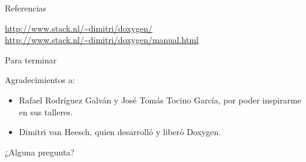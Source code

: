 \documentclass[12pt,xcolor=svgnames]{beamer}
\begin{document}
\begin{frame}{Referencias}
  \scriptsize
  \begin{thebibliography}{6}
  \bibitem{} \url{http://www.stack.nl/~dimitri/doxygen/}
  \bibitem{} \url{http://www.stack.nl/~dimitri/doxygen/manual.html}
  \end{thebibliography}
\end{frame}

\begin{frame}{Para terminar}

  Agradecimientos a:
  \begin{itemize}
  \item Rafael Rodríguez Galván y José Tomás Tocino García, por poder
    inspirarme en sus talleres.
  \item Dimitri van Heesch, quien desarrolló y liberó Doxygen.
  \end{itemize}
  \vspace*{1cm}
  \begin{center}
    {\Large ¿Alguna pregunta?}
  \end{center}
\end{frame}

\licencia
\end{document}
